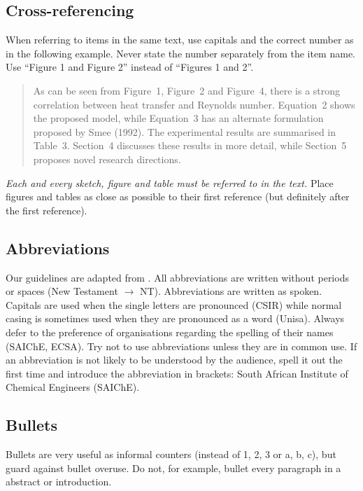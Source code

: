 \documentclass[a5paper, 10pt]{article}
\begin{document}
\subsection{Cross-referencing}
When referring to items in the same text, use capitals and the
correct number as in the following example. 
Never state the number separately from the item name. 
Use ``Figure 1 and Figure 2'' instead of ``Figures 1 and 2''.

\begin{quote}
  As can be seen from Figure~1, Figure~2 and Figure~4, there is a strong
  correlation between heat transfer and Reynolds number.  Equation~2
  shows the proposed model, while Equation~3 has an alternate
  formulation proposed by Smee (1992).  The experimental results are
  summarised in Table~3.  Section~4 discusses these results in more
  detail, while Section~5 proposes novel research directions.
\end{quote}

\emph{Each and every sketch, figure and  table must be referred to in the text.} 
Place figures and tables as close as possible to their first reference (but definitely after the first reference).  


\subsection{Abbreviations}
\label{sec:abbreviations}
Our guidelines are adapted from \citet[17]{burger}.  All abbreviations
are written without periods or spaces (New Testament $\rightarrow$
NT).  Abbreviations are written as spoken. Capitals are used when the
single letters are pronounced (CSIR) while normal casing is sometimes used
when they are pronounced as a word (Unisa).  Always defer to the
preference of organisations regarding the spelling of their names
(SAIChE, ECSA).  Try not to use abbreviations unless they are in
common use.  If an abbreviation is not likely to be understood by the
audience, spell it out the first time and introduce the abbreviation
in brackets: South African Institute of Chemical Engineers (SAIChE).

\subsection{Bullets}
\label{sec:bullets}
Bullets are very useful as informal counters (instead of 1, 2, 3 or a, b, c), but guard against bullet overuse.
Do not, for example, bullet every paragraph in a abstract or introduction.
\end{document}
